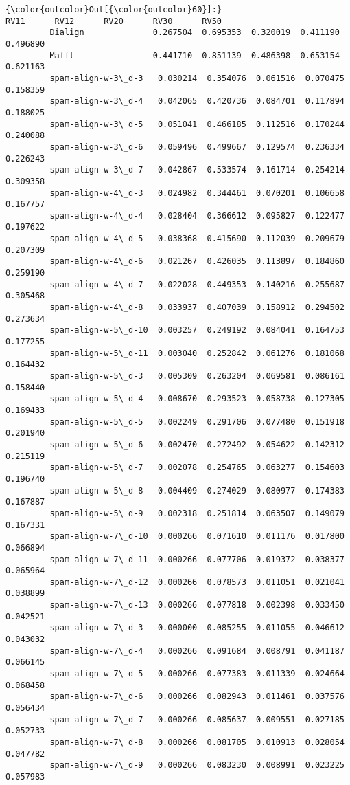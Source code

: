 \documentclass[11pt]{article}
\begin{document}
\begin{Verbatim}[commandchars=\\\{\}]
{\color{outcolor}Out[{\color{outcolor}60}]:}                          RV11      RV12      RV20      RV30      RV50
         Dialign              0.267504  0.695353  0.320019  0.411190  0.496890
         Mafft                0.441710  0.851139  0.486398  0.653154  0.621163
         spam-align-w-3\_d-3   0.030214  0.354076  0.061516  0.070475  0.158359
         spam-align-w-3\_d-4   0.042065  0.420736  0.084701  0.117894  0.188025
         spam-align-w-3\_d-5   0.051041  0.466185  0.112516  0.170244  0.240088
         spam-align-w-3\_d-6   0.059496  0.499667  0.129574  0.236334  0.226243
         spam-align-w-3\_d-7   0.042867  0.533574  0.161714  0.254214  0.309358
         spam-align-w-4\_d-3   0.024982  0.344461  0.070201  0.106658  0.167757
         spam-align-w-4\_d-4   0.028404  0.366612  0.095827  0.122477  0.197622
         spam-align-w-4\_d-5   0.038368  0.415690  0.112039  0.209679  0.207309
         spam-align-w-4\_d-6   0.021267  0.426035  0.113897  0.184860  0.259190
         spam-align-w-4\_d-7   0.022028  0.449353  0.140216  0.255687  0.305468
         spam-align-w-4\_d-8   0.033937  0.407039  0.158912  0.294502  0.273634
         spam-align-w-5\_d-10  0.003257  0.249192  0.084041  0.164753  0.177255
         spam-align-w-5\_d-11  0.003040  0.252842  0.061276  0.181068  0.164432
         spam-align-w-5\_d-3   0.005309  0.263204  0.069581  0.086161  0.158440
         spam-align-w-5\_d-4   0.008670  0.293523  0.058738  0.127305  0.169433
         spam-align-w-5\_d-5   0.002249  0.291706  0.077480  0.151918  0.201940
         spam-align-w-5\_d-6   0.002470  0.272492  0.054622  0.142312  0.215119
         spam-align-w-5\_d-7   0.002078  0.254765  0.063277  0.154603  0.196740
         spam-align-w-5\_d-8   0.004409  0.274029  0.080977  0.174383  0.167887
         spam-align-w-5\_d-9   0.002318  0.251814  0.063507  0.149079  0.167331
         spam-align-w-7\_d-10  0.000266  0.071610  0.011176  0.017800  0.066894
         spam-align-w-7\_d-11  0.000266  0.077706  0.019372  0.038377  0.065964
         spam-align-w-7\_d-12  0.000266  0.078573  0.011051  0.021041  0.038899
         spam-align-w-7\_d-13  0.000266  0.077818  0.002398  0.033450  0.042521
         spam-align-w-7\_d-3   0.000000  0.085255  0.011055  0.046612  0.043032
         spam-align-w-7\_d-4   0.000266  0.091684  0.008791  0.041187  0.066145
         spam-align-w-7\_d-5   0.000266  0.077383  0.011339  0.024664  0.068458
         spam-align-w-7\_d-6   0.000266  0.082943  0.011461  0.037576  0.056434
         spam-align-w-7\_d-7   0.000266  0.085637  0.009551  0.027185  0.052733
         spam-align-w-7\_d-8   0.000266  0.081705  0.010913  0.028054  0.047782
         spam-align-w-7\_d-9   0.000266  0.083230  0.008991  0.023225  0.057983
\end{Verbatim}
            
\end{document}
